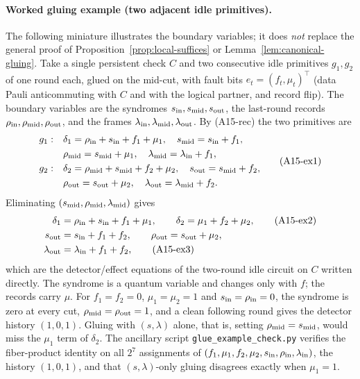 \documentclass[aps,prx,reprint,superscriptaddress,nofootinbib,floatfix,longbibliography]{revtex4-2}
\theoremstyle{definition}
\begin{document}
\paragraph{Worked gluing example (two adjacent idle primitives).}
\label{ex:gluing-two-idle}
The following miniature illustrates the boundary variables; it does
\emph{not} replace the general proof of Proposition~\ref{prop:local-suffices}
or Lemma~\ref{lem:canonical-gluing}.  Take a single persistent check $C$ and
two consecutive idle primitives $g_1,g_2$ of one round each, glued on the
mid-cut, with fault bits $e_t=(f_t,\mu_t)^\top$ (data Pauli anticommuting with
$C$ and with the logical partner, and record flip).  The boundary variables
are the syndromes $s_{\rm in},s_{\rm mid},s_{\rm out}$, the last-round records
$\rho_{\rm in},\rho_{\rm mid},\rho_{\rm out}$, and the frames
$\lambda_{\rm in},\lambda_{\rm mid},\lambda_{\rm out}$.  By (A15-rec) the two
primitives are
\begin{equation}
\begin{aligned}
 g_1:&\quad \delta_1=\rho_{\rm in}+s_{\rm in}+f_1+\mu_1,\quad
       s_{\rm mid}=s_{\rm in}+f_1,\\
     &\quad \rho_{\rm mid}=s_{\rm mid}+\mu_1,\quad
       \lambda_{\rm mid}=\lambda_{\rm in}+f_1,\\
 g_2:&\quad \delta_2=\rho_{\rm mid}+s_{\rm mid}+f_2+\mu_2,\quad
       s_{\rm out}=s_{\rm mid}+f_2,\\
     &\quad \rho_{\rm out}=s_{\rm out}+\mu_2,\quad
       \lambda_{\rm out}=\lambda_{\rm mid}+f_2.
\end{aligned}
\tag{A15-ex1}
\end{equation}
Eliminating $(s_{\rm mid},\rho_{\rm mid},\lambda_{\rm mid})$ gives
\begin{align}
 \delta_1&=\rho_{\rm in}+s_{\rm in}+f_1+\mu_1,\qquad
 \delta_2=\mu_1+f_2+\mu_2,
 \tag{A15-ex2}\\
 s_{\rm out}&=s_{\rm in}+f_1+f_2,\qquad \rho_{\rm out}=s_{\rm out}+\mu_2,
 \nonumber\\
 \lambda_{\rm out}&=\lambda_{\rm in}+f_1+f_2,
 \tag{A15-ex3}
\end{align}
which are the detector/effect equations of the two-round idle circuit on $C$
written directly.  The syndrome is a quantum variable and changes only with
$f$; the records carry $\mu$.  For $f_1=f_2=0$, $\mu_1=\mu_2=1$ and
$s_{\rm in}=\rho_{\rm in}=0$, the syndrome is zero at every cut,
$\rho_{\rm mid}=\rho_{\rm out}=1$, and a clean following round gives the
detector history $(1,0,1)$.  Gluing with $(s,\lambda)$ alone, that is, setting
$\rho_{\rm mid}=s_{\rm mid}$, would miss the $\mu_1$ term of $\delta_2$.  The
ancillary script \texttt{glue\_example\_check.py} verifies the fiber-product
identity on all $2^7$ assignments of
$(f_1,\mu_1,f_2,\mu_2,s_{\rm in},\rho_{\rm in},\lambda_{\rm in})$, the history
$(1,0,1)$, and that $(s,\lambda)$-only gluing disagrees exactly when
$\mu_1=1$.
\end{document}

